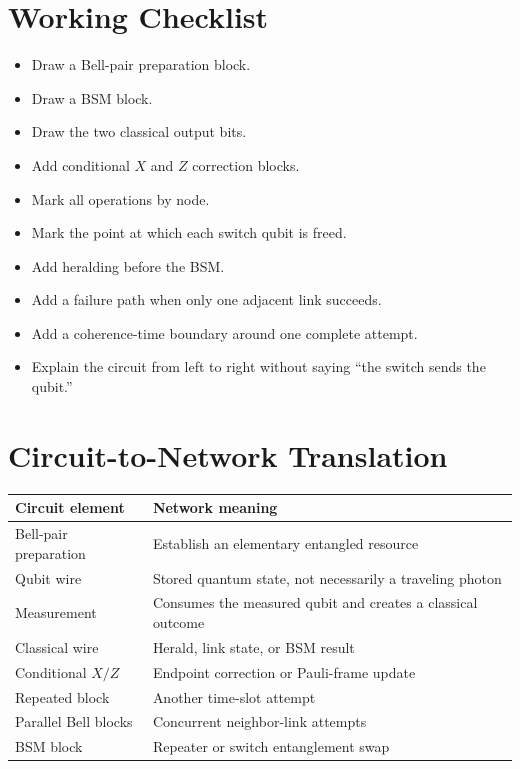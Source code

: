 \documentclass[11pt]{article}
\newcommand{\unchecked}{\(\square\)}
\begin{document}
\section{Working Checklist}

\begin{itemize}[leftmargin=*]
    \item[\unchecked] Draw a Bell-pair preparation block.
    \item[\unchecked] Draw a BSM block.
    \item[\unchecked] Draw the two classical output bits.
    \item[\unchecked] Add conditional \(X\) and \(Z\) correction blocks.
    \item[\unchecked] Mark all operations by node.
    \item[\unchecked] Mark the point at which each switch qubit is freed.
    \item[\unchecked] Add heralding before the BSM.
    \item[\unchecked] Add a failure path when only one adjacent link succeeds.
    \item[\unchecked] Add a coherence-time boundary around one complete attempt.
    \item[\unchecked] Explain the circuit from left to right without saying ``the switch sends the qubit.''
\end{itemize}

\section{Circuit-to-Network Translation}

\begin{center}
\begin{tabular}{|p{}|p{}|}
\hline
\textbf{Circuit element} & \textbf{Network meaning} \\
\hline
Bell-pair preparation & Establish an elementary entangled resource \\
\hline
Qubit wire & Stored quantum state, not necessarily a traveling photon \\
\hline
Measurement & Consumes the measured qubit and creates a classical outcome \\
\hline
Classical wire & Herald, link state, or BSM result \\
\hline
Conditional \(X/Z\) & Endpoint correction or Pauli-frame update \\
\hline
Repeated block & Another time-slot attempt \\
\hline
Parallel Bell blocks & Concurrent neighbor-link attempts \\
\hline
BSM block & Repeater or switch entanglement swap \\
\hline
\end{tabular}
\end{center}
\end{document}
